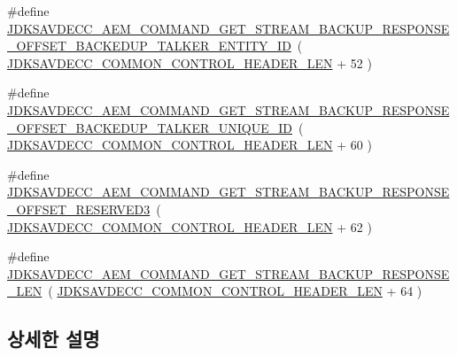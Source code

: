 \begin{DoxyCompactItemize}
\item 
\#define \hyperlink{group__command__get__stream__backup__response_ga5f3756b27202ec3f798f53408923662b}{J\+D\+K\+S\+A\+V\+D\+E\+C\+C\+\_\+\+A\+E\+M\+\_\+\+C\+O\+M\+M\+A\+N\+D\+\_\+\+G\+E\+T\+\_\+\+S\+T\+R\+E\+A\+M\+\_\+\+B\+A\+C\+K\+U\+P\+\_\+\+R\+E\+S\+P\+O\+N\+S\+E\+\_\+\+O\+F\+F\+S\+E\+T\+\_\+\+B\+A\+C\+K\+E\+D\+U\+P\+\_\+\+T\+A\+L\+K\+E\+R\+\_\+\+E\+N\+T\+I\+T\+Y\+\_\+\+ID}~( \hyperlink{group__jdksavdecc__avtp__common__control__header_gaae84052886fb1bb42f3bc5f85b741dff}{J\+D\+K\+S\+A\+V\+D\+E\+C\+C\+\_\+\+C\+O\+M\+M\+O\+N\+\_\+\+C\+O\+N\+T\+R\+O\+L\+\_\+\+H\+E\+A\+D\+E\+R\+\_\+\+L\+EN} + 52 )
\item 
\#define \hyperlink{group__command__get__stream__backup__response_ga1f7c919151e8b7e72a4da212b05bc1c5}{J\+D\+K\+S\+A\+V\+D\+E\+C\+C\+\_\+\+A\+E\+M\+\_\+\+C\+O\+M\+M\+A\+N\+D\+\_\+\+G\+E\+T\+\_\+\+S\+T\+R\+E\+A\+M\+\_\+\+B\+A\+C\+K\+U\+P\+\_\+\+R\+E\+S\+P\+O\+N\+S\+E\+\_\+\+O\+F\+F\+S\+E\+T\+\_\+\+B\+A\+C\+K\+E\+D\+U\+P\+\_\+\+T\+A\+L\+K\+E\+R\+\_\+\+U\+N\+I\+Q\+U\+E\+\_\+\+ID}~( \hyperlink{group__jdksavdecc__avtp__common__control__header_gaae84052886fb1bb42f3bc5f85b741dff}{J\+D\+K\+S\+A\+V\+D\+E\+C\+C\+\_\+\+C\+O\+M\+M\+O\+N\+\_\+\+C\+O\+N\+T\+R\+O\+L\+\_\+\+H\+E\+A\+D\+E\+R\+\_\+\+L\+EN} + 60 )
\item 
\#define \hyperlink{group__command__get__stream__backup__response_ga2a09530a94129400a36ece8129315731}{J\+D\+K\+S\+A\+V\+D\+E\+C\+C\+\_\+\+A\+E\+M\+\_\+\+C\+O\+M\+M\+A\+N\+D\+\_\+\+G\+E\+T\+\_\+\+S\+T\+R\+E\+A\+M\+\_\+\+B\+A\+C\+K\+U\+P\+\_\+\+R\+E\+S\+P\+O\+N\+S\+E\+\_\+\+O\+F\+F\+S\+E\+T\+\_\+\+R\+E\+S\+E\+R\+V\+E\+D3}~( \hyperlink{group__jdksavdecc__avtp__common__control__header_gaae84052886fb1bb42f3bc5f85b741dff}{J\+D\+K\+S\+A\+V\+D\+E\+C\+C\+\_\+\+C\+O\+M\+M\+O\+N\+\_\+\+C\+O\+N\+T\+R\+O\+L\+\_\+\+H\+E\+A\+D\+E\+R\+\_\+\+L\+EN} + 62 )
\item 
\#define \hyperlink{group__command__get__stream__backup__response_gabd9877bbe5765eadb7f92f9bb6895db3}{J\+D\+K\+S\+A\+V\+D\+E\+C\+C\+\_\+\+A\+E\+M\+\_\+\+C\+O\+M\+M\+A\+N\+D\+\_\+\+G\+E\+T\+\_\+\+S\+T\+R\+E\+A\+M\+\_\+\+B\+A\+C\+K\+U\+P\+\_\+\+R\+E\+S\+P\+O\+N\+S\+E\+\_\+\+L\+EN}~( \hyperlink{group__jdksavdecc__avtp__common__control__header_gaae84052886fb1bb42f3bc5f85b741dff}{J\+D\+K\+S\+A\+V\+D\+E\+C\+C\+\_\+\+C\+O\+M\+M\+O\+N\+\_\+\+C\+O\+N\+T\+R\+O\+L\+\_\+\+H\+E\+A\+D\+E\+R\+\_\+\+L\+EN} + 64 )
\end{DoxyCompactItemize}


\subsection{상세한 설명}


